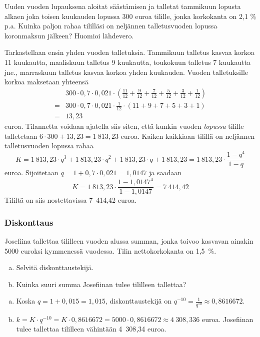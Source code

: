 \documentclass[a4paper,10pt]{article}\usepackage[]{graphicx}\usepackage[]{color}
\begin{document}
\begin{question} 
    Uuden vuoden lupauksena aloitat säästämisen ja talletat tammikuun lopusta alkaen joka toisen kuukauden lopussa 300 euroa tilille,
jonka korkokanta on 2{,}1 \% p.a. Kuinka paljon rahaa tililläsi on neljännen talletusvuoden lopussa koronmaksun jälkeen? Huomioi lähdevero.
\end{question}
\begin{solution}
    Tarkastellaan ensin yhden vuoden talletuksia. Tammikuun talletus kasvaa korkoa 11 kuukautta, maaliskuun talletus 9 kuukautta,
    toukokuun talletus 7 kuukautta jne., marraskuun talletus kasvaa korkoa yhden kuukauden. Vuoden talletuksille korkoa maksetaan yhteensä
    \begin{align*}
        &300\cdot0,7\cdot0,021\cdot\left(\frac{11}{12} + \frac{9}{12} + \frac{7}{12} + \frac{5}{12} + \frac{3}{12} + \frac{1}{12}\right)\\
        =&300\cdot0,7\cdot0,021\cdot\frac{1}{12}\cdot(11+9+7+5+3+1)\\
        =& 13,23
    \end{align*}
    euroa. Tilannetta voidaan ajatella siis siten, että kunkin vuoden \emph{lopussa} tilille talletetaan \(6\cdot300+13,23 = 1~813{,}23\) euroa.
     Kaiken kaikkiaan tilillä on neljännen talletusvuoden lopussa rahaa
     \[
         K = 1~813{,}23\cdot q^3 + 1~813{,}23\cdot q^2 + 1~813{,}23\cdot q + 1~813{,}23 = 1~813{,}23\cdot\frac{1-q^4}{1-q}
     \]
    euroa. Sijoitetaan \(q = 1 + 0,7\cdot0,021 = 1,0147\) ja saadaan
    \[
        K = 1~813{,}23\cdot\frac{1-1,0147^4}{1-1,0147} =  7~414{,}42
    \]
    Tililtä on siis nostettavissa 7~414{,}42 euroa.
\end{solution}

\subsubsection*{Diskonttaus}

\begin{question} Josefiina tallettaa tililleen vuoden alussa summan, jonka toivoo kasvavan ainakin 5000 euroksi kymmenessä vuodessa. Tilin nettokorkokanta on 1,5~\%.
\begin{enumerate}[(a)]
    \item Selvitä diskonttaustekijä.
    \item Kuinka suuri summa Josefiinan tulee tililleen tallettaa?
\end{enumerate}
\end{question}
\begin{solution}
    \begin{enumerate}[(a)]
        \item Koska \(q = 1 + 0,015 = 1,015\), diskonttaustekijä on \(q^{-10} = \frac{1}{q^{10}}\approx 0{,}8616672\).
        \item \(k = K\cdot q^{-10} = K\cdot 0{,}8616672 = 5000\cdot 0{,}8616672\approx 4~308{,}336\) euroa.
        Josefiinan tulee tallettaa tililleen vähintään 4~308{,}34 euroa.
    \end{enumerate}
\end{solution}
\end{document}
